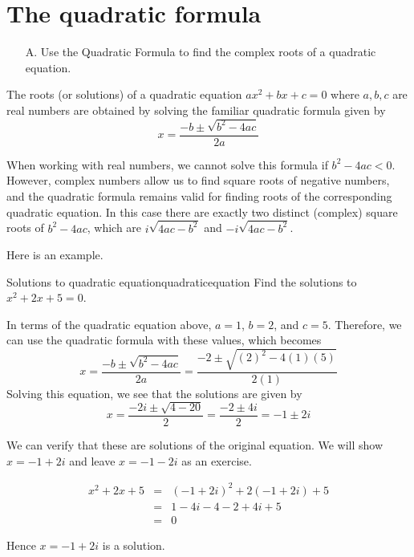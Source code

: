\section{The quadratic formula}

\begin{outcome}
\begin{enumerate}
\item[A.] Use the Quadratic Formula to find the complex roots of a quadratic equation. 
\end{enumerate}
\end{outcome}

The roots (or solutions) of a quadratic equation $ax^{2}+bx+c=0$ where $a,b,c$ are real numbers are
obtained by solving the familiar quadratic formula
given by 
\begin{equation*}
x=
\frac{-b\pm \sqrt{b^{2}-4ac}}{2a}
\end{equation*}

When working with real numbers, we cannot solve this formula if
$b^{2}-4ac<0.$ However, complex numbers allow us to find square roots
of negative numbers, and the quadratic formula remains valid for
finding roots of the corresponding quadratic equation.   In this case
there are exactly two distinct (complex) square roots of $b^{2}-4ac$, which are 
$i\sqrt{4ac-b^{2}}$ and $-i\sqrt{4ac-b^{2}}$.

Here is an example. 

\begin{example}{Solutions to quadratic equation}{quadraticequation}
Find the solutions to $x^{2}+2x+5=0$.
\end{example}

\begin{solution}
In terms of the quadratic equation above, $a=1$, $b=2$, and $c=5$.
Therefore, we can use the quadratic formula with these values, which becomes
\begin{equation*}
x=
\frac{-b\pm \sqrt{b^{2}-4ac}}{2a}
= 
\frac{-2 \pm \sqrt{\left(2\right)^{2} - 4 (1)(5)}}{2(1)}
\end{equation*}
Solving this equation, we see that the solutions are given by
\begin{equation*}
x=\frac{-2i\pm \sqrt{4-20}}{2}=\frac{-2\pm 4i}{2}=-1\pm 2i
\end{equation*}

We can verify that these are solutions of the original equation. 
We will show $x = -1+2i$ and leave $x = -1-2i$ as an exercise.

\begin{eqnarray*}
x^{2}+2x+5
&=& (-1+2i)^2 + 2(-1+2i) + 5 \\
&=& 1 - 4i - 4 -2 + 4i + 5 \\
&=& 0
\end{eqnarray*}

Hence $x = -1+2i$ is a solution. 
\end{solution}


